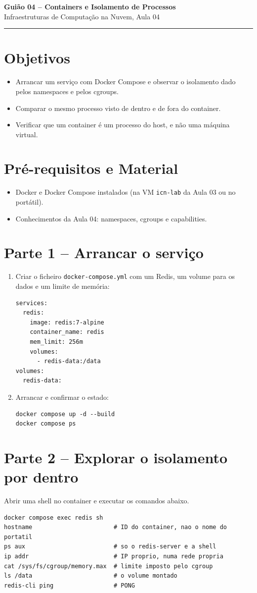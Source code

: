\documentclass[11pt,a4paper]{article}
\newcommand{\guiaotitle}[2]{%
  \begin{center}
  {\Large\bfseries\color{TextEspresso} #1}\\[0.3cm]
  {\normalsize\color{NudeTaupe} #2}\\[0.2cm]
  {\color{NudeTaupe}\rule{4cm}{0.5pt}}
  \end{center}
  \vspace{0.5cm}
}
\begin{document}
\guiaotitle{Guião 04 -- Containers e Isolamento de Processos}{Infraestruturas de Computação na Nuvem, Aula 04}

\section{Objetivos}
\begin{itemize}[itemsep=0.2cm]
  \item Arrancar um serviço com Docker Compose e observar o isolamento dado pelos namespaces e pelos cgroups.
  \item Comparar o mesmo processo visto de dentro e de fora do container.
  \item Verificar que um container é um processo do host, e não uma máquina virtual.
\end{itemize}

\section{Pré-requisitos e Material}
\begin{itemize}[itemsep=0.2cm]
  \item Docker e Docker Compose instalados (na VM \texttt{icn-lab} da Aula 03 ou no portátil).
  \item Conhecimentos da Aula 04: namespaces, cgroups e capabilities.
\end{itemize}

\section{Parte 1 -- Arrancar o serviço}
\begin{enumerate}[label=\arabic*.]
  \item Criar o ficheiro \texttt{docker-compose.yml} com um Redis, um volume para os dados e um limite de memória:
\begin{lstlisting}
services:
  redis:
    image: redis:7-alpine
    container_name: redis
    mem_limit: 256m
    volumes:
      - redis-data:/data
volumes:
  redis-data:
\end{lstlisting}
  \item Arrancar e confirmar o estado:
\begin{lstlisting}
docker compose up -d --build
docker compose ps
\end{lstlisting}
\end{enumerate}

\section{Parte 2 -- Explorar o isolamento por dentro}
Abrir uma shell no container e executar os comandos abaixo.
\begin{lstlisting}
docker compose exec redis sh
hostname                       # ID do container, nao o nome do portatil
ps aux                         # so o redis-server e a shell
ip addr                        # IP proprio, numa rede propria
cat /sys/fs/cgroup/memory.max  # limite imposto pelo cgroup
ls /data                       # o volume montado
redis-cli ping                 # PONG
\end{lstlisting}
\end{document}
